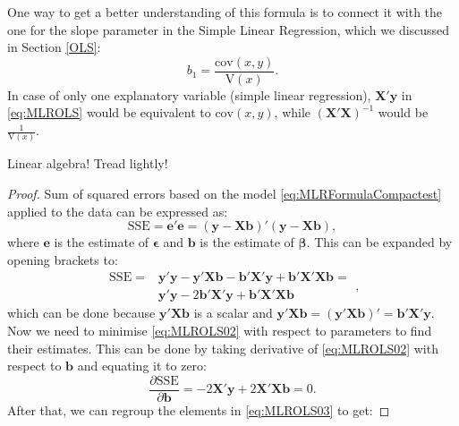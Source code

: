 \documentclass[
]{book}
\theoremstyle{definition}
\theoremstyle{definition}
\theoremstyle{definition}
\theoremstyle{definition}
\theoremstyle{remark}
\begin{document}
One way to get a better understanding of this formula is to connect it with the one for the slope parameter in the Simple Linear Regression, which we discussed in Section \ref{OLS}:
\begin{equation*}
        {b}_1 = \frac{\mathrm{cov}(x,y)}{\mathrm{V}(x)} .
\end{equation*}
In case of only one explanatory variable (simple linear regression), \(\mathbf{X}' \mathbf{y}\) in \eqref{eq:MLROLS} would be equivalent to \(\mathrm{cov}(x,y)\), while \(\left(\mathbf{X}' \mathbf{X}\right)^{-1}\) would be \(\frac{1}{\mathrm{V}(x)}\).

Linear algebra! Tread lightly!

\begin{proof}
Sum of squared errors based on the model \eqref{eq:MLRFormulaCompactest} applied to the data can be expressed as:
\begin{equation*}
    \mathrm{SSE} = \mathbf{e}' \mathbf{e} = (\mathbf{y} - \mathbf{X} \mathbf{b})' (\mathbf{y} - \mathbf{X} \mathbf{b}) ,
\end{equation*}
where \(\mathbf{e}\) is the estimate of \(\boldsymbol{\epsilon}\) and \(\mathbf{b}\) is the estimate of \(\boldsymbol{\beta}\). This can be expanded by opening brackets to:
\begin{equation}
    \begin{aligned}
        \mathrm{SSE} = & \mathbf{y}'\mathbf{y} - \mathbf{y}' \mathbf{X} \mathbf{b} - \mathbf{b}' \mathbf{X}' \mathbf{y} + \mathbf{b}' \mathbf{X}' \mathbf{X} \mathbf{b} = \\
        & \mathbf{y}'\mathbf{y} - 2 \mathbf{b}' \mathbf{X}' \mathbf{y} + \mathbf{b}' \mathbf{X}' \mathbf{X} \mathbf{b}
    \end{aligned} ,
    \label{eq:MLROLS02}
\end{equation}
which can be done because \(\mathbf{y}' \mathbf{X} \mathbf{b}\) is a scalar and \(\mathbf{y}' \mathbf{X} \mathbf{b} = (\mathbf{y}' \mathbf{X} \mathbf{b})' = \mathbf{b}' \mathbf{X}' \mathbf{y}\). Now we need to minimise \eqref{eq:MLROLS02} with respect to parameters to find their estimates. This can be done by taking derivative of \eqref{eq:MLROLS02} with respect to \(\mathbf{b}\) and equating it to zero:
\begin{equation}
    \frac{\partial \mathrm{SSE}}{\partial \mathbf{b}} = - 2 \mathbf{X}' \mathbf{y} + 2 \mathbf{X}' \mathbf{X} \mathbf{b} = 0.
    \label{eq:MLROLS03}
\end{equation}
After that, we can regroup the elements in \eqref{eq:MLROLS03} to get:

\end{proof}
\end{document}
